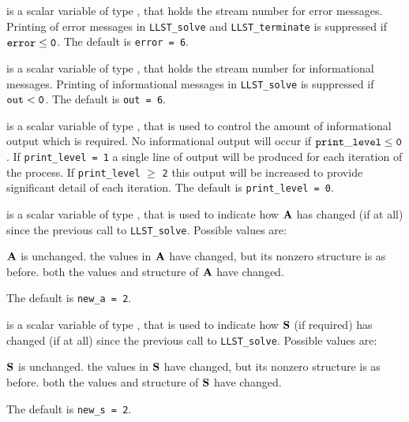 \documentclass{galahad}
\newcommand{\packagename}{LLST}
\begin{document}
\begin{description}
 is a scalar variable of type \integer, that holds the
stream number for error messages.
Printing of error messages in
{\tt \packagename\_solve} and {\tt \packagename\_terminate}
is suppressed if ${\tt error} \leq {\tt 0}$.
The default is {\tt error = 6}.

 is a scalar variable of type \integer, that holds the
stream number for informational messages.
Printing of informational messages in
{\tt \packagename\_solve} is suppressed if ${\tt out} < {\tt 0}$.
The default is {\tt out = 6}.

 is a scalar variable of type \integer,
that is used
to control the amount of informational output which is required. No
informational output will occur if ${\tt print\_level} \leq {\tt 0}$. If
{\tt print\_level = 1} a single line of output will be produced for each
iteration of the process. If {\tt print\_level} $\geq$ {\tt 2} this output
will be increased to provide significant detail of each iteration.
The default is {\tt print\_level = 0}.


 is a scalar variable of type \integer, that is used
to indicate how ${\mathbf{A}}$ has changed (if at all) since the previous
call to {\tt \packagename\_solve}. Possible values are:
\begin{description}
 ${\mathbf{A}}$ is unchanged.
 the values in ${\mathbf{A}}$ have changed, but its nonzero structure
is as before.
 both the values and structure of ${\mathbf{A}}$ have changed.
\end{description}
The default is {\tt new\_a = 2}.

 is a scalar variable of type \integer, that is used
to indicate how ${\mathbf{S}}$ (if required) has changed (if at all) since the previous
call to {\tt \packagename\_solve}. Possible values are:
\begin{description}
 ${\mathbf{S}}$ is unchanged.
 the values in ${\mathbf{S}}$ have changed, but its nonzero structure
is as before.
 both the values and structure of ${\mathbf{S}}$ have changed.
\end{description}
The default is {\tt new\_s = 2}.


\end{description}
\end{document}
